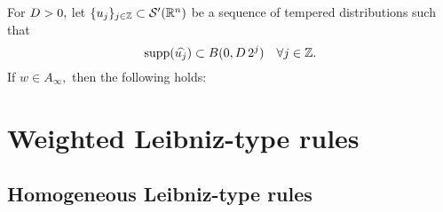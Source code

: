 \begin{theorem}\label{thm:Nikolskij:weighted} For $D> 0,$ let $\{u_j\}_{j \in \mathbb{Z}} \subset \mathcal{S}'({{\mathbb R}^n})$ be a sequence of tempered distributions such that
\begin{equation*}
{\rm{supp}}(\widehat{u_j}) \subset B(0, D\, 2^j ) \quad \forall j \in \mathbb{Z}.
\end{equation*}
If $w\in A_\infty,$ then the following holds:  
\end{theorem} 
 
 
 
 \section{Weighted Leibniz-type rules}
 
 \subsection{Homogeneous Leibniz-type rules}
 
